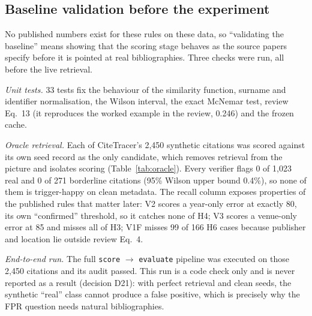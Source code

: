 \documentclass[conference]{IEEEtran}
\begin{document}
\subsection{Baseline validation before the experiment}
No published numbers exist for these rules on these data, so ``validating the baseline'' means showing
that the scoring stage behaves as the source papers specify before it is pointed at real bibliographies.
Three checks were run, all before the live retrieval.

\emph{Unit tests.} 33 tests fix the behaviour of the similarity function, surname and identifier
normalisation, the Wilson interval, the exact McNemar test, review Eq.~13 (it reproduces the worked
example in the review, 0.246) and the frozen cache.

\emph{Oracle retrieval.} Each of CiteTracer's 2,450 synthetic citations was scored against its own seed
record as the only candidate, which removes retrieval from the picture and isolates scoring
(Table~\ref{tab:oracle}). Every verifier flags 0 of 1,023 real and 0 of 271 borderline citations
(95\% Wilson upper bound 0.4\%), so none of them is trigger-happy on clean metadata. The recall column
exposes properties of the published rules that matter later: V2 scores a year-only error at exactly 80,
its own ``confirmed'' threshold, so it catches none of H4; V3 scores a venue-only error at 85 and misses
all of H3; V1F misses 99 of 166 H6 cases because publisher and location lie outside review Eq.~4.

\emph{End-to-end run.} The full \texttt{score} $\rightarrow$ \texttt{evaluate} pipeline was executed on
those 2,450 citations and its audit passed. This run is a code check only and is never reported as a
result (decision D21): with perfect retrieval and clean seeds, the synthetic ``real'' class cannot
produce a false positive, which is precisely why the FPR question needs natural bibliographies.

\begin{table}[t]
\centering\footnotesize
\caption{Baseline validation: share flagged (\%) under oracle retrieval on CiteTracer's synthetic set.
Reproduced byte-for-byte on the laptop from the 28 Oct run.}
\label{tab:oracle}
\resizebox{\columnwidth}{!}{}
\end{table}
\end{document}
